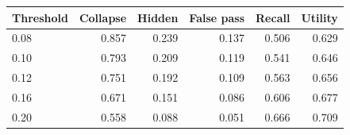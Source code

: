 \begin{tabular}{lrrrrr}
\toprule
Threshold & Collapse & Hidden & False pass & Recall & Utility \\
\midrule
0.08 & 0.857 & 0.239 & 0.137 & 0.506 & 0.629 \\
0.10 & 0.793 & 0.209 & 0.119 & 0.541 & 0.646 \\
0.12 & 0.751 & 0.192 & 0.109 & 0.563 & 0.656 \\
0.16 & 0.671 & 0.151 & 0.086 & 0.606 & 0.677 \\
0.20 & 0.558 & 0.088 & 0.051 & 0.666 & 0.709 \\
\bottomrule
\end{tabular}
